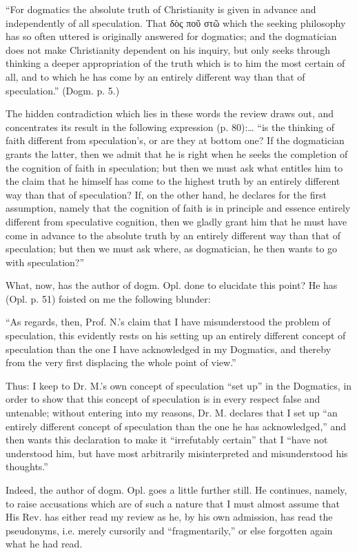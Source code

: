 \documentclass[12pt,a4paper,openany]{book}
\newcommand{\opage}[1]{\marginnote{\footnotesize\textit{[#1]}}}
\begin{document}
``For dogmatics the absolute truth of Christianity is
given in advance and independently of all speculation. That
δὸς ποῦ στῶ which the seeking philosophy has so often
uttered is originally answered for dogmatics; and the
dogmatician does not make Christianity dependent on his inquiry,
but only seeks through thinking a deeper appropriation
of the truth which is to him the most certain of all, and to
which he has come by an entirely different way than that of speculation.''
(Dogm. p. 5.)

The hidden contradiction which lies in these words the
review draws out, and concentrates its result in the following expression
(p. 80):\dots{} ``is the thinking of faith different from
\setcounter{footnote}{0}%
\opage{53}speculation's, or are they at bottom one? If the dogmatician grants
the latter, then we admit that he is right
when he seeks the completion of the cognition of faith in speculation;
but then we must ask what entitles him
to the claim that he himself has come to the highest
truth by an entirely different way than that of speculation? If, on the other hand,
he declares for the first assumption, namely that
the cognition of faith is in principle and essence entirely different
from speculative cognition, then we gladly grant him
that he must have come in advance to the absolute truth
by an entirely different way than that of speculation; but then we must
ask where, as dogmatician, he then wants to go with speculation?''


What, now, has the author of dogm. Opl. done to
elucidate this point? He has (Opl. p. 51) foisted on me
the following blunder:

``As regards, then, Prof. N.'s claim that I
have misunderstood the problem of speculation, this evidently
rests on his setting up an entirely different concept of
speculation than the one I have acknowledged in my Dogmatics,
and thereby from the very first displacing the whole point of view.''

Thus: I keep to Dr. M.'s own concept of speculation ``set up''
in the Dogmatics, in order to show that this concept of speculation
is in every respect false and untenable; without
entering into my reasons, Dr. M. declares that I
set up ``an entirely different concept of speculation than the one
he has acknowledged,'' and then wants this declaration
to make it ``irrefutably certain'' that I ``have not understood him,
but have most arbitrarily misinterpreted and misunderstood his
thoughts.''

\setcounter{footnote}{0}%
\opage{54}Indeed, the author of dogm. Opl. goes a little further still.
He continues, namely, to raise accusations which are of such a
nature that I must almost assume that His Rev. has either
read my review as he, by his own admission, has
read the pseudonyms, i.e. merely cursorily and ``fragmentarily,''
or else forgotten again what he had read.
\end{document}
